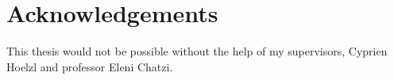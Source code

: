 \newpage
\chapter*{Acknowledgements}
This thesis would not be possible without the help of my supervisors, Cyprien Hoelzl and professor Eleni Chatzi. 



\newpage


